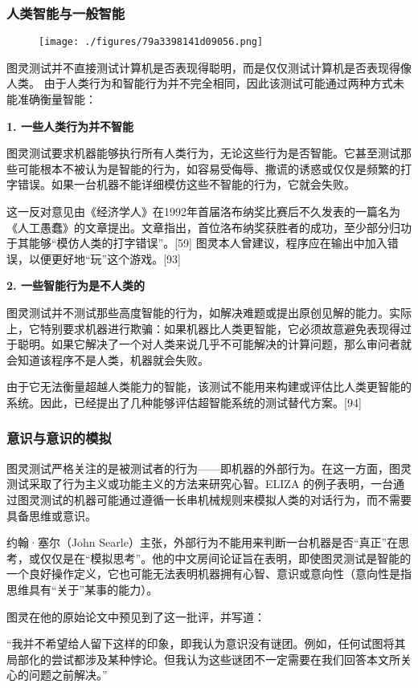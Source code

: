 \subsubsection{人类智能与一般智能}
\begin{figure}[ht]
\centering
\texttt{[image: ./figures/79a3398141d09056.png]}
\caption{} \label{fig_TLCS_4}
\end{figure}
图灵测试并不直接测试计算机是否表现得聪明，而是仅仅测试计算机是否表现得像人类。 由于人类行为和智能行为并不完全相同，因此该测试可能通过两种方式未能准确衡量智能：

\textbf{1. 一些人类行为并不智能}

图灵测试要求机器能够执行所有人类行为，无论这些行为是否智能。它甚至测试那些可能根本不被认为是智能的行为，如容易受侮辱、撒谎的诱惑或仅仅是频繁的打字错误。如果一台机器不能详细模仿这些不智能的行为，它就会失败。

这一反对意见由《经济学人》在1992年首届洛布纳奖比赛后不久发表的一篇名为《人工愚蠢》的文章提出。文章指出，首位洛布纳奖获胜者的成功，至少部分归功于其能够“模仿人类的打字错误”。[59] 图灵本人曾建议，程序应在输出中加入错误，以便更好地“玩”这个游戏。[93]

\textbf{2. 一些智能行为是不人类的}

图灵测试并不测试那些高度智能的行为，如解决难题或提出原创见解的能力。实际上，它特别要求机器进行欺骗：如果机器比人类更智能，它必须故意避免表现得过于聪明。如果它解决了一个对人类来说几乎不可能解决的计算问题，那么审问者就会知道该程序不是人类，机器就会失败。

由于它无法衡量超越人类能力的智能，该测试不能用来构建或评估比人类更智能的系统。因此，已经提出了几种能够评估超智能系统的测试替代方案。[94]
\subsubsection{意识与意识的模拟}
图灵测试严格关注的是被测试者的行为——即机器的外部行为。在这一方面，图灵测试采取了行为主义或功能主义的方法来研究心智。ELIZA 的例子表明，一台通过图灵测试的机器可能通过遵循一长串机械规则来模拟人类的对话行为，而不需要具备思维或意识。

约翰·塞尔（John Searle）主张，外部行为不能用来判断一台机器是否“真正”在思考，或仅仅是在“模拟思考”。他的中文房间论证旨在表明，即使图灵测试是智能的一个良好操作定义，它也可能无法表明机器拥有心智、意识或意向性（意向性是指思维具有“关于”某事的能力）。

图灵在他的原始论文中预见到了这一批评，并写道：

“我并不希望给人留下这样的印象，即我认为意识没有谜团。例如，任何试图将其局部化的尝试都涉及某种悖论。但我认为这些谜团不一定需要在我们回答本文所关心的问题之前解决。”
